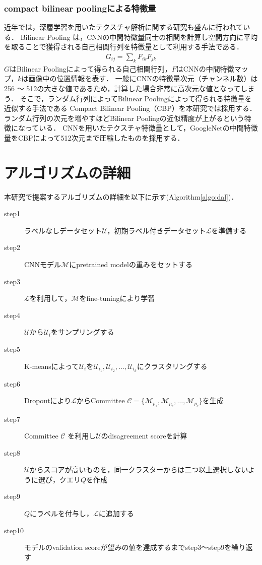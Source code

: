 \subsubsection{compact bilinear poolingによる特徴量}
近年では，深層学習を用いたテクスチャ解析に関する研究も盛んに行われている．
Bilinear Pooling \cite{lin2015bilinear}は，CNNの中間特徴量同士の相関を計算し空間方向に平均を取ることで獲得される自己相関行列を特徴量として利用する手法である．
\begin{eqnarray}
G_{ij} = \sum_k{F_{ik} F_{jk}}
\end{eqnarray}
$G$はBilinear Poolingによって得られる自己相関行列，$F$はCNNの中間特徴マップ，$k$は画像中の位置情報を表す．
一般にCNNの特徴量次元（チャンネル数）は256 〜 512の大きな値であるため，計算した場合非常に高次元な値となってしまう．
そこで，ランダム行列によってBilinear Poolingによって得られる特徴量を近似する手法である
Compact Bilinear Pooling（CBP）\cite{gao2016compact}を本研究では採用する．
ランダム行列の次元を増やすほどBilinear Poolingの近似精度が上がるという特徴になっている．
CNNを用いたテクスチャ特徴量として，GoogleNet\cite{szegedy2015going}の中間特徴量をCBPによって512次元まで圧縮したものを採用する．

\section{アルゴリズムの詳細}

本研究で提案するアルゴリズムの詳細を以下に示す(Algorithm\ref{algo:dal})．

\begin{description}
    \item[step1] ラベルなしデータセット$\mathcal{U}$，初期ラベル付きデータセット$\mathcal{L}$を準備する
    \item[step2] CNNモデル$\mathcal{M}$にpretrained modelの重みをセットする
    \item[step3] $\mathcal{L}$を利用して，$\mathcal{M}$をfine-tuningにより学習
    \item[step4] $\mathcal{U}$から$\mathcal{U}_i$をサンプリングする
    \item[step5] K-meansによって$\mathcal{U}_i$を$\mathcal{U}_{i_1}, \mathcal{U}_{i_2}, \dots, \mathcal{U}_{i_k}$にクラスタリングする
    \item[step6] Dropoutにより$\mathcal{L}$からCommittee $\mathcal{C} = \{\mathcal{M}_{p_1}, \mathcal{M}_{p_2}, \dots, \mathcal{M}_{p_c} \}$を生成
    \item[step7] Committee $\mathcal{C}$ を利用し$\mathcal{U}$のdisagreement scoreを計算
    \item[step8] $\mathcal{U}$からスコアが高いものを，同一クラスターからは二つ以上選択しないように選び，クエリ$Q$を作成
    \item[step9] $Q$にラベルを付与し，$\mathcal{L}$に追加する
    \item[step10] モデルのvalidation scoreが望みの値を達成するまでstep3〜step9を繰り返す
\end{description}


